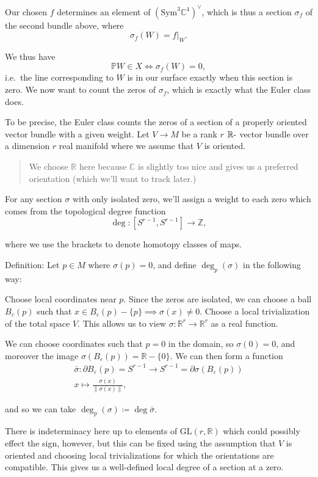 \documentclass[11pt]{scrreprt}
\theoremstyle{definition}
\newcommand{\RR}[0]{{\mathbb{R}}}
\newcommand{\ZZ}[0]{{\mathbb{Z}}}
\newcommand{\CC}[0]{{\mathbb{C}}}
\newcommand{\PP}[0]{{\mathbb{P}}}
\newcommand{\GL}[0]{{\text{GL}}}
\newcommand{\dual}[0]{\vee}
\newcommand{\sym}[0]{\mathrm{Sym}}
\newcommand{\theset}[1]{\{{#1}\}}
\newcommand{\norm}[1]{{{\lVert}{#1}{\rVert}}}
\newcommand{\restrictionof}[2]{{\left.{#1}\right|_{#2}}}
\newcommand{\dash}[0]{{\hbox{-}}}
\newcommand{\del}[0]{{\partial}}
\newcommand{\definedas}[0]{\coloneqq}
\begin{document}
Our chosen \(f\) determines an element of \((\sym^3 \CC^4)^\dual\),
which is thus a section \(\sigma_f\) of the second bundle above, where
\[
\sigma_f(W) = \restrictionof{f}{W}.
\]

We thus have \[
\PP W \in X \iff \sigma_f(W) = 0,
\] i.e.~the line corresponding to \(W\) is in our surface exactly when
this section is zero. We now want to count the zeros of \(\sigma_f\),
which is exactly what the Euler class does.

To be precise, the Euler class counts the zeros of a section of a
properly oriented vector bundle with a given weight. Let \(V\to M\) be a
rank \(r\) \(\RR\dash\) vector bundle over a dimension \(r\) real
manifold where we assume that \(V\) is oriented.

\begin{quote}
We choose \(\RR\) here because \(\CC\) is slightly too nice and gives us
a preferred orientation (which we'll want to track later.)
\end{quote}

For any section \(\sigma\) with only isolated zero, we'll assign a
weight to each zero which comes from the topological degree function \[
\deg: [S^{r-1}, S^{r-1}] \to \ZZ,
\]

where we use the brackets to denote homotopy classes of maps.

Definition: Let \(p\in M\) where \(\sigma(p) = 0\), and define
\(\deg_p(\sigma)\) in the following way:

Choose local coordinates near \(p\). Since the zeros are isolated, we
can choose a ball \(B_\varepsilon(p)\) such that
\(x\in B_\varepsilon(p) - \theset{p} \implies \sigma(x) \neq 0\). Choose
a local trivialization of the total space \(V\). This allows us to view
\(\sigma: \RR^r \to \RR^r\) as a real function.

We can choose coordinates such that \(p = 0\) in the domain, so
\(\sigma(0) = 0\), and moreover the image
\(\sigma(B_\varepsilon(p)) = \RR - \theset{0}\). We can then form a
function
\begin{align*}
\bar\sigma: \del B_\varepsilon(p) = S^{r-1} \to S^{r-1} = \del \sigma(B_\varepsilon(p)) \\
x \mapsto \frac{\sigma(x)} {\norm{\sigma(x)}},
\end{align*}

and so we can take \(\deg_p(\sigma) \definedas \deg \bar \sigma\).

There is indeterminacy here up to elements of \(\GL(r, \RR)\) which
could possibly effect the sign, however, but this can be fixed using the
assumption that \(V\) is oriented and choosing local trivializations for
which the orientations are compatible. This gives us a well-defined
local degree of a section at a zero.
\end{document}

